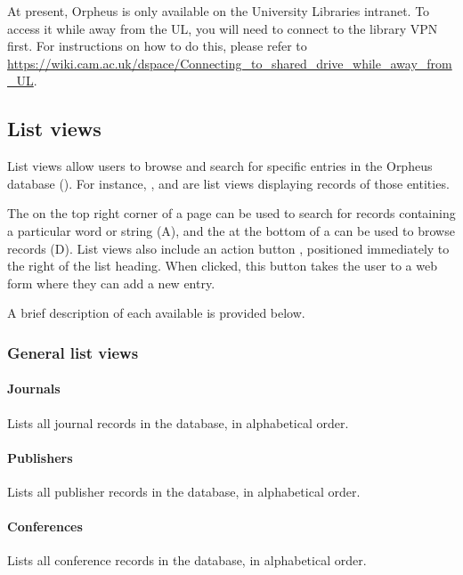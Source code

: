 \documentclass[british, 12pt]{article}
\begin{document}
\begin{warn}
 At present, Orpheus is only available on the University Libraries intranet. To access it while away from the UL, you will need to connect to the library VPN first. For instructions on how to do this, please refer to \url{https://wiki.cam.ac.uk/dspace/Connecting_to_shared_drive_while_away_from_UL}.
\end{warn}

\subsection{List views}
\label{sec-list-views}

List views allow users to browse and search for specific entries in the Orpheus database (). 
For instance, ,  and  are list views displaying records of those entities.

The  on the top right corner of a  page can be used to search for records containing a particular word or string (\figp{\ref{fig-journals}}A), and the  at the bottom of a  can be used to browse records (\figp{\ref{fig-journals}}D). List views also include an action button , positioned immediately to the right of the list heading. When clicked, this button takes the user to a web form where they can add a new entry.

A brief description of each available  is provided below.

\subsubsection{General list views}

\paragraph{Journals} Lists all journal records in the database, in alphabetical order.
\paragraph{Publishers} Lists all publisher records in the database, in alphabetical order.
\paragraph{Conferences} Lists all conference records in the database, in alphabetical order.
\end{document}
